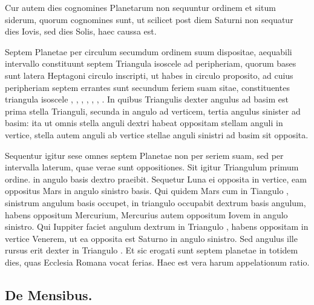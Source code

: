 Cur autem dies cognomines Planetarum non sequuntur ordinem et
situm siderum, quorum cognomines sunt, ut scilicet post diem Saturni
non sequatur dies Iovis, sed dies Solis, haec caussa est.
\begin{figure}[h]
  \centering
  \def\svgwidth{9\baselineskip}
  {\astrofont}
  \label{fig:planetae}
\end{figure}
Septem Planetae
per circulum secumdum ordinem suum
dispositae, aequabili intervallo constituunt septem
Triangula isoscele ad peripheriam, quorum
bases sunt latera Heptagoni circulo inscripti,
ut habes in circulo proposito, ad cuius
peripheriam septem errantes sunt secundum
feriem suam sitae, constituentes triangula
isoscele , , ,
 , , , .
In quibus Triangulis dexter angulus ad basim
est prima stella Trianguli, secunda in angulo ad verticem, tertia angulus
sinister ad basim: ita ut omnis stella anguli dextri habeat oppositam
stellam anguli in vertice, stella autem anguli ab vertice stellae
anguli sinistri ad basim sit opposita.

Sequentur igitur sese omnes septem
Planetae non per seriem suam, sed per intervalla laterum, quae
verae sunt oppositiones.
Sit igitur Triangulum  primum ordine.
 in angulo basis dextro praeibit.
Sequetur Luna ei opposita in vertice,
eam oppositus Mars in angulo sinistro basis.
Qui quidem Mars cum in
Tiangulo , sinistrum angulum basis occupet,
 in triangulo  occupabit
dextrum basis angulum, habens oppositum Mercurium,
Mercurius autem oppositum Iovem in angulo sinistro.
Qui Iuppiter
faciet angulum dextrum in Triangulo , habens oppositam in vertice
Venerem, ut ea opposita est Saturno in angulo sinistro.
Sed angulus
ille rursus erit dexter in Triangulo .
Et sic erogati sunt septem
planetae in totidem dies, quas Ecclesia Romana vocat ferias.
Haec est vera harum appelationum ratio.

\subsection{De Mensibus.}

